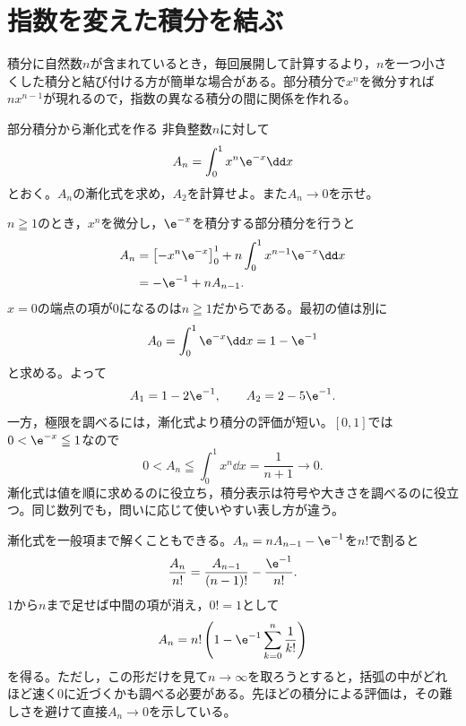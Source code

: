 \section{指数を変えた積分を結ぶ}\label{節:積分漸化式}

積分に自然数$n$が含まれているとき，毎回展開して計算するより，$n$を一つ小さくした積分と結び付ける方が簡単な場合がある。部分積分で$x^n$を微分すれば$n x^{n-1}$が現れるので，指数の異なる積分の間に関係を作れる。

\begin{example}{部分積分から漸化式を作る}
非負整数$n$に対して
\[
 A_n=\int_0^1 x^n\e^{-x}\dd x
\]
とおく。$A_n$の漸化式を求め，$A_2$を計算せよ。また$A_n\to0$を示せ。
\end{example}

$n\geqq1$のとき，$x^n$を微分し，$\e^{-x}$を積分する部分積分を行うと
\begin{align*}
 A_n
 &=\left[-x^n\e^{-x}\right]_0^1
   +n\int_0^1x^{n-1}\e^{-x}\dd x\\
 &=-\e^{-1}+nA_{n-1}.
\end{align*}
$x=0$の端点の項が$0$になるのは$n\geqq1$だからである。最初の値は別に
\[
 A_0=\int_0^1\e^{-x}\dd x=1-\e^{-1}
\]
と求める。よって
\[
 A_1=1-2\e^{-1},\qquad A_2=2-5\e^{-1}.
\]
一方，極限を調べるには，漸化式より積分の評価が短い。$[0,1]$では$0<\e^{-x}\leqq1$なので
\[
 0<A_n\leqq\int_0^1x^n\dd x=\frac1{n+1}\longrightarrow0.
\]
漸化式は値を順に求めるのに役立ち，積分表示は符号や大きさを調べるのに役立つ。同じ数列でも，問いに応じて使いやすい表し方が違う。

漸化式を一般項まで解くこともできる。$A_n=nA_{n-1}-\e^{-1}$を$n!$で割ると
\[
 \frac{A_n}{n!}=\frac{A_{n-1}}{(n-1)!}-\frac{\e^{-1}}{n!}.
\]
$1$から$n$まで足せば中間の項が消え，$0!=1$として
\[
 A_n=n!\left(1-\e^{-1}\sum_{k=0}^{n}\frac1{k!}\right)
\]
を得る。ただし，この形だけを見て$n\to\infty$を取ろうとすると，括弧の中がどれほど速く$0$に近づくかも調べる必要がある。先ほどの積分による評価は，その難しさを避けて直接$A_n\to0$を示している。

